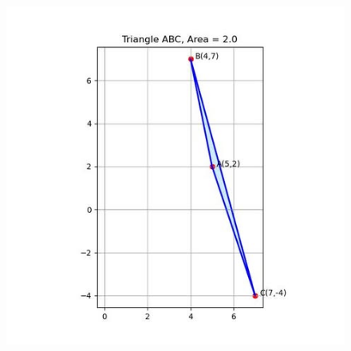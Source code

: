 \documentclass[journal]{IEEEtran}
\begin{document}
\begin{figure}[h]
    \centering
    \includegraphics[scale=0.5]{figs/2.6.25.jpg}
    \caption{}
    \label{fig:1}
\end{figure}
\end{document}
